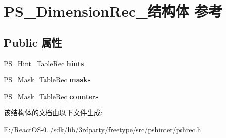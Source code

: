\hypertarget{struct_p_s___dimension_rec__}{}\section{P\+S\+\_\+\+Dimension\+Rec\+\_\+结构体 参考}
\label{struct_p_s___dimension_rec__}
\subsection*{Public 属性}
\begin{DoxyCompactItemize}
\item 
\mbox{\label{struct_p_s___dimension_rec___ab17240e2369b8bfb3571dde1835b2957}} 
\hyperlink{struct_p_s___hint___table_rec__}{P\+S\+\_\+\+Hint\+\_\+\+Table\+Rec} {\bfseries hints}
\item 
\mbox{\label{struct_p_s___dimension_rec___a20947113c40dde015cff4e71b7dec4e7}} 
\hyperlink{struct_p_s___mask___table_rec__}{P\+S\+\_\+\+Mask\+\_\+\+Table\+Rec} {\bfseries masks}
\item 
\mbox{\label{struct_p_s___dimension_rec___a8d1dcd6a6eea15fe82f50f97ec0afe6c}} 
\hyperlink{struct_p_s___mask___table_rec__}{P\+S\+\_\+\+Mask\+\_\+\+Table\+Rec} {\bfseries counters}
\end{DoxyCompactItemize}


该结构体的文档由以下文件生成\+:\begin{DoxyCompactItemize}
\item 
E\+:/\+React\+O\+S-\/0../sdk/lib/3rdparty/freetype/src/pshinter/pshrec.\+h\end{DoxyCompactItemize}
